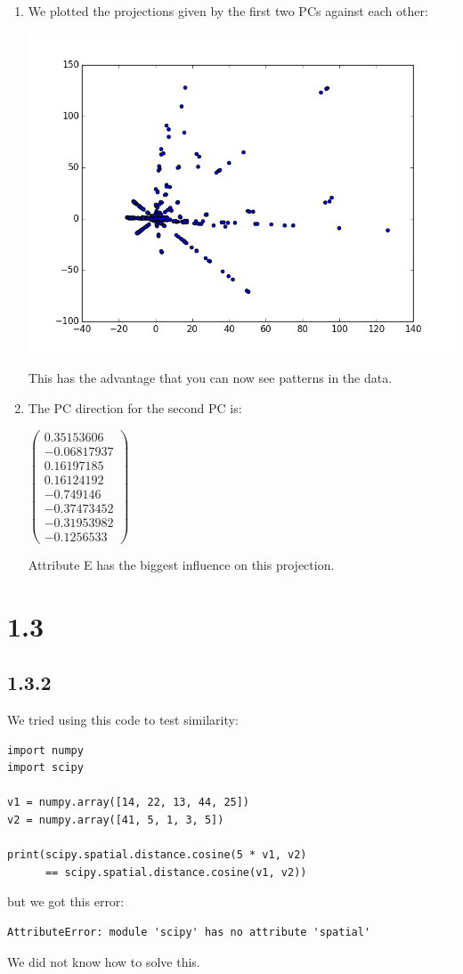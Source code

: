 \documentclass[12pt]{article}
\begin{document}
\begin{enumerate}[a]
	\item %
	We plotted the projections given by the first two PCs against each other:

	\includegraphics[width=\textwidth]{plot_1_2_2-d}

	This has the advantage that you can now see patterns in the data.

	\item %
	The PC direction for the second PC is:

	$\begin{pmatrix}
		0.35153606\\ -0.06817937\\ 0.16197185\\ 0.16124192\\ -0.749146\\ -0.37473452\\ -0.31953982\\ -0.1256533
	\end{pmatrix}$

	Attribute E has the biggest influence on this projection.
\end{enumerate}

\section*{1.3}
\subsection*{1.3.2}
We tried using this code to test similarity:

\begin{lstlisting}
import numpy
import scipy

v1 = numpy.array([14, 22, 13, 44, 25])
v2 = numpy.array([41, 5, 1, 3, 5])

print(scipy.spatial.distance.cosine(5 * v1, v2)
      == scipy.spatial.distance.cosine(v1, v2))
\end{lstlisting}

but we got this error:

\begin{lstlisting}
AttributeError: module 'scipy' has no attribute 'spatial'
\end{lstlisting}

We did not know how to solve this.
\end{document}
